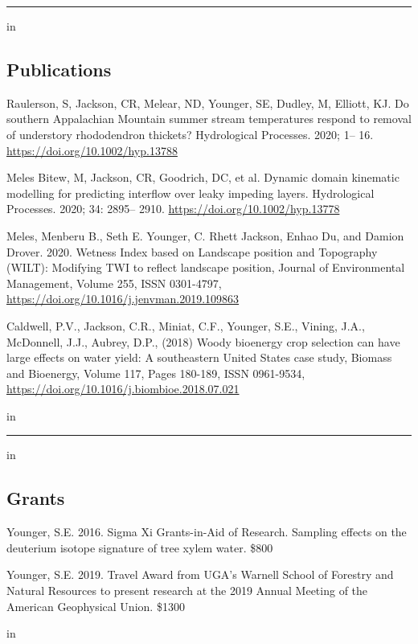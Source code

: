 \documentclass[10pt,letterpaper]{article}
\begin{document}
\pagebreak

\hrule
\vspace{-0.4em}
 in
\subsection*{Publications}

\begin{hangparas}{.25in}{1}

Raulerson, S, Jackson, CR, Melear, ND, Younger, SE, Dudley, M, Elliott, KJ. Do southern Appalachian Mountain summer stream temperatures respond to removal of understory rhododendron thickets? Hydrological Processes. 2020; 1– 16. \url{https://doi.org/10.1002/hyp.13788}

Meles Bitew, M, Jackson, CR, Goodrich, DC, et al. Dynamic domain kinematic modelling for predicting interflow over leaky impeding layers. Hydrological Processes. 2020; 34: 2895– 2910. \url{https://doi.org/10.1002/hyp.13778}

Meles, Menberu B., Seth E. Younger, C. Rhett Jackson, Enhao Du, and Damion Drover. 2020. Wetness Index based on Landscape position and Topography (WILT): Modifying TWI to reflect landscape position, Journal of Environmental Management, Volume 255, ISSN 0301-4797, \url{https://doi.org/10.1016/j.jenvman.2019.109863}

Caldwell, P.V., Jackson, C.R., Miniat, C.F., Younger, S.E., Vining, J.A., McDonnell, J.J., Aubrey, D.P., (2018) Woody bioenergy crop selection can have large effects on water yield: A southeastern United States case study,
Biomass and Bioenergy, Volume 117, Pages 180-189, ISSN 0961-9534, \url{https://doi.org/10.1016/j.biombioe.2018.07.021}

 in
\vspace{-0.4em}

\end{hangparas}

\hrule
\vspace{-0.4em}
 in
\subsection*{Grants}

\begin{hangparas}{.25in}{1}

Younger, S.E. 2016. Sigma Xi Grants-in-Aid of Research. Sampling effects on the deuterium isotope signature of tree xylem water. \$800


Younger, S.E. 2019. Travel Award from UGA's Warnell School of Forestry and Natural Resources to present research at the 2019 Annual Meeting of the American Geophysical Union. \$1300

 in
\vspace{-0.4em}

\end{hangparas}
\end{document}

